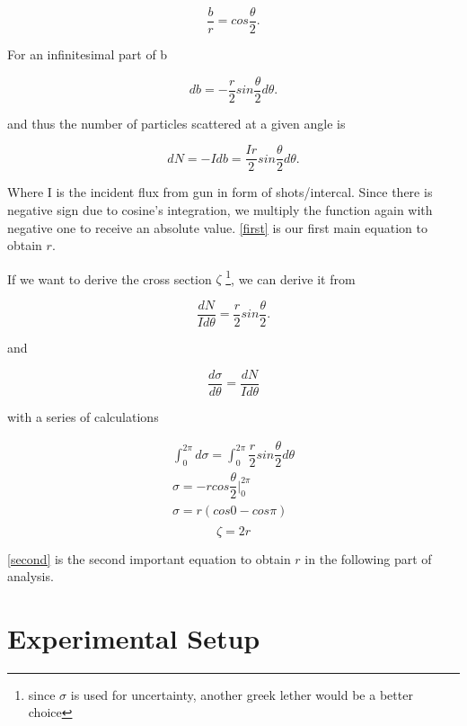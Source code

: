 \documentclass[a4paper]{article}
\begin{document}
\begin{multicols}{2}
\begin{equation}
\dfrac{b}{r} = cos\dfrac{\theta}{2}.
\end{equation}

For an infinitesimal part of b

\begin{equation}
db = -\dfrac{r}{2}sin\dfrac{\theta}{2}d\theta.
\end{equation}

and thus the number of particles scattered at a given angle is

\begin{equation} \label{first}
dN = -Idb = \dfrac{Ir}{2}sin\dfrac{\theta}{2}d\theta.
\end{equation}

Where I is the incident flux from gun in form of shots/intercal. Since there is negative sign due to cosine's integration, we multiply the function again with negative one to receive an absolute value. \ref{first} is our first main equation to obtain $r$.

If we want to derive the cross section $\zeta$ \footnote{since $\sigma$ is used for uncertainty, another greek lether would be a better choice}, we can derive it from

\begin{equation}
\dfrac{dN}{Id\theta} = \dfrac{r}{2}sin\dfrac{\theta}{2}.
\end{equation}

and

\begin{equation}
\dfrac{d\sigma}{d\theta} = \dfrac{dN}{Id\theta}
\end{equation}

with a series of calculations

\begin{align}
\int^{2\pi}_{0} d\sigma = \int^{2\pi}_{0}\dfrac{r}{2}sin\dfrac{\theta}{2}d\theta \\
\sigma = -rcos\dfrac{\theta}{2}|^{2\pi}_{0} \\
\sigma = r(cos0 - cos\pi) \\
\end{align}
\begin{equation}
\zeta = 2r \label{second}
\end{equation}

\ref{second} is the second important equation to obtain $r$ in the following part of analysis.

\section{Experimental Setup}


\end{multicols}
\end{document}
